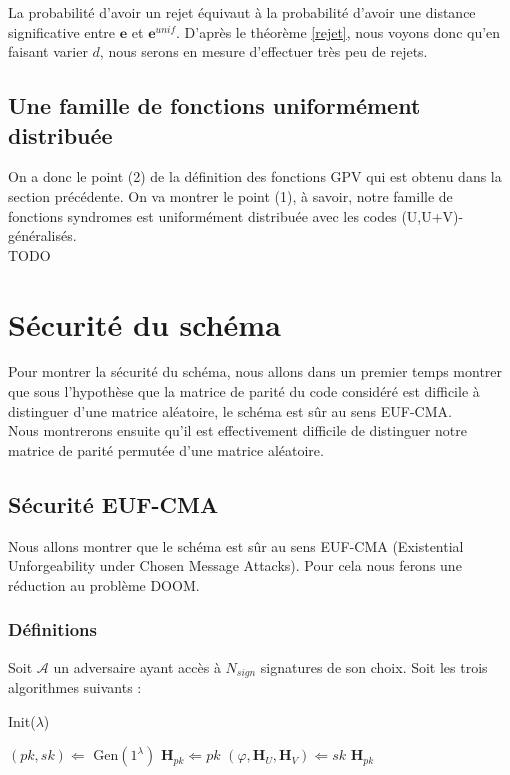 \documentclass[12pt]{article}
\theoremstyle{plain}
\newcommand{\e}{\mathbf{e}}
\begin{document}
\noindent La probabilité d'avoir un rejet équivaut à la probabilité d'avoir une distance significative entre $\e$ et $\e^{unif}$. D'après le théorème \ref{rejet}, nous voyons donc qu'en faisant varier $d$, nous serons en mesure d'effectuer très peu de rejets.


\subsection{Une famille de fonctions uniformément distribuée}
On a donc le point (2) de la définition des fonctions GPV qui est obtenu dans la section précédente. On va montrer le point (1), à savoir, notre famille de fonctions syndromes est uniformément distribuée avec les codes (U,U+V)-généralisés. \\
TODO


\section{Sécurité du schéma}
Pour montrer la sécurité du schéma, nous allons dans un premier temps montrer que sous l'hypothèse que la matrice de parité du code considéré est difficile à distinguer d'une matrice aléatoire, le schéma est sûr au sens EUF-CMA.\\
Nous montrerons ensuite qu'il est effectivement difficile de distinguer notre matrice de parité permutée d'une matrice aléatoire. \\

\subsection{Sécurité EUF-CMA}
Nous allons montrer que le schéma est sûr au sens EUF-CMA (Existential Unforgeability under Chosen Message Attacks). Pour cela nous ferons une réduction au problème DOOM.
\subsubsection{Définitions}

Soit $\mathcal{A}$ un adversaire ayant accès à $N_{sign}$ signatures de son choix. Soit les trois algorithmes suivants :


\begin{algorithm} [h]
	\caption{Init($\lambda$)}
	\begin{algorithmic}[1]
    	\STATE $(pk,sk) \Longleftarrow$ Gen$(1^\lambda)$ 
    	\STATE $\mathbf{H}_{pk} \Longleftarrow pk$
    	\STATE $(\varphi,\mathbf{H}_{U},\mathbf{H}_{V})\Longleftarrow sk$
    	\RETURN $\mathbf{H}_{pk}$
    \end{algorithmic}
\end{algorithm}
\end{document}
